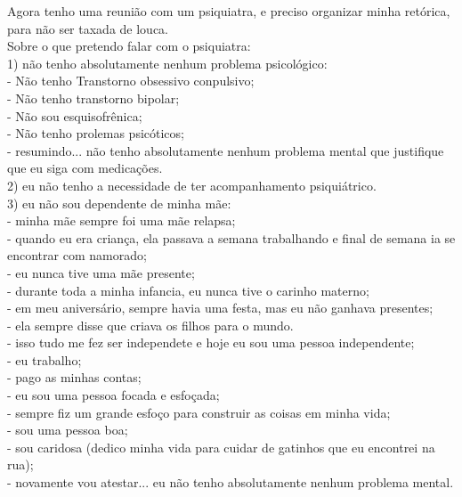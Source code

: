 \documentclass{book}
\begin{document}
Agora tenho uma reunião com um psiquiatra, e preciso organizar minha retórica, para não ser taxada de louca. \\

Sobre o que pretendo falar com o psiquiatra: \\

1) não tenho absolutamente nenhum problema psicológico: \\

\noindent - Não tenho Transtorno obsessivo conpulsivo; \\
- Não tenho transtorno bipolar; \\
- Não sou esquisofrênica; \\
- Não tenho prolemas psicóticos; \\
- resumindo... não tenho absolutamente nenhum problema mental que justifique que eu siga com medicações. \\

2) eu não tenho a necessidade de ter acompanhamento psiquiátrico. \\

3) eu não sou dependente de minha mãe: \\

\noindent - minha mãe sempre foi uma mãe relapsa; \\
- quando eu era criança, ela passava a semana trabalhando e final de semana ia se encontrar com namorado; \\
- eu nunca tive uma mãe presente; \\
- durante toda a minha infancia, eu nunca tive o carinho materno; \\
- em meu aniversário, sempre havia uma festa, mas eu não ganhava presentes; \\
- ela sempre disse que criava os filhos para o mundo. \\

\noindent - isso tudo me fez ser independete e hoje eu sou uma pessoa independente; \\

\noindent - eu trabalho; \\
- pago as minhas contas; \\
- eu sou uma pessoa focada e esfoçada; \\
- sempre fiz um grande esfoço para construir as coisas em minha vida; \\
- sou uma pessoa boa; \\
- sou caridosa (dedico minha vida para cuidar de gatinhos que eu encontrei na rua); \\
- novamente vou atestar... eu não tenho absolutamente nenhum problema mental. \\
\end{document}
